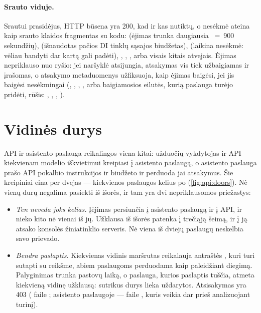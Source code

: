\paragraph{Srauto viduje.} Srautui prasidėjus, HTTP būsena yra 200, kad ir kas nutiktų, o
nesėkmė ateina kaip srauto klaidos fragmentas su kodu:  (ėjimas trunka
daugiausia ~=~900 sekundžių),  (išnaudotas pačios
DI tinklų sąsajos biudžetas),  (laikina nesėkmė: vėliau bandyti dar kartą
gali padėti), , , ,
 arba  visais kitais atvejais. Ėjimas nepriklauso
nuo ryšio: jei naršyklė atsijungia, atsakymas vis tiek užbaigiamas ir įrašomas, o atsakymo
metaduomenys užfiksuoja, kaip ėjimas baigėsi, jei jis baigėsi nesėkmingai (,
, , ,  arba baigiamosios eilutės, kurią
paslauga turėjo pridėti, rūšis: , , ,
).


\section{Vidinės durys}\label{sec:api:internal}

API ir asistento paslauga reikalingos viena kitai: užduočių vykdytojas ir API kiekvienam modelio
iškvietimui kreipiasi į asistento paslaugą, o asistento paslauga prašo API pokalbio instrukcijos
ir biudžeto ir perduoda jai atsakymus. Šie kreipiniai eina per dvejas  ---
kiekvienos paslaugos kelius po  (\cref{fig:api:doors}). Nė vienų durų negalima
pasiekti iš išorės, ir tam yra dvi nepriklausomos priežastys:

\begin{itemize}
  \item \emph{Ten neveda joks kelias.} Įėjimas persiunčia  į asistento
    paslaugą ir  į API, ir nieko kito nė vienai iš jų. Užklausa
     iš išorės patenka į trečiąją šeimą, ir į ją atsako konsolės
    žiniatinklio serveris. Nė viena iš dviejų paslaugų neskelbia savo prievado.
  \item \emph{Bendra paslaptis.} Kiekvienas vidinis maršrutas reikalauja antraštės
    , kuri turi sutapti su reikšme, abiem paslaugoms perduodama kaip
     paleidžiant diegimą. Palyginimas trunka pastovų laiką, o
    paslauga, kurios paslaptis tuščia, atmeta kiekvieną vidinę užklausą: sutrikus durys
    lieka uždarytos. Atsisakymas yra 403  ( faile
    ; asistento paslaugoje --- 
    faile , kuris veikia dar prieš analizuojant turinį).
\end{itemize}

